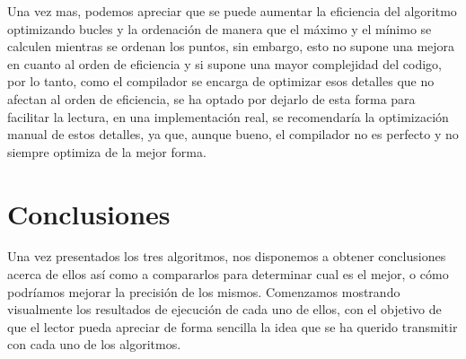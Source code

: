 \documentclass[11pt,openany]{book}
\begin{document}
Una vez mas, podemos apreciar que se puede aumentar la eficiencia del algoritmo
optimizando bucles y la ordenación de manera que el máximo y el mínimo se calculen
mientras se ordenan los puntos, sin embargo, esto no supone una mejora en cuanto
al orden de eficiencia y si supone una mayor complejidad del codigo, por lo tanto,
como el compilador se encarga de optimizar esos detalles que no afectan al orden
de eficiencia, se ha optado por dejarlo de esta forma para facilitar la lectura, 
en una implementación real, se recomendaría la optimización manual de estos detalles, ya que,
aunque bueno, el compilador no es perfecto y no siempre optimiza de la mejor forma.
\section{Conclusiones}
Una vez presentados los tres algoritmos, nos disponemos a obtener conclusiones acerca
de ellos así como a compararlos para determinar cual es el mejor, o cómo podríamos
mejorar la precisión de los mismos. Comenzamos mostrando visualmente los resultados
de ejecución de cada uno de ellos, con el objetivo de que el lector pueda apreciar 
de forma sencilla la idea que se ha querido transmitir con cada uno de los algoritmos.
\end{document}
